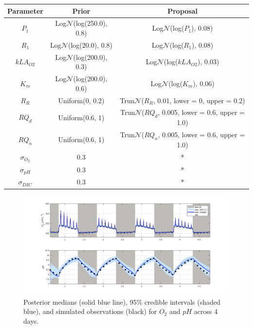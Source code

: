 \documentclass{ruthesis}
\begin{document}
\begin{tabular}{c | c  |  c}
	\hline
	\bfseries{Parameter} & \bfseries{Prior} &  \bfseries{Proposal} \\ \hline
	$P_1$  		& Log$\mathcal{N}$(log(250.0), 0.8)  & Log$\mathcal{N}$(log($P_1$), 0.08)   \\
	$R_1$  		& Log$\mathcal{N}$(log(20.0), 0.8)   & Log$\mathcal{N}$(log($R_1$), 0.08)   \\
	$kLA_{O2}$  & Log$\mathcal{N}$(log(200.0), 0.3)  & Log$\mathcal{N}$(log($kLA_{O2}$), 0.03) \\
	$K_m$ 		&  Log$\mathcal{N}$(log(200.0), 0.6) & Log$\mathcal{N}$(log($K_m$), 0.06) \\
	$R_R$  		& Uniform(0, 0.2) &  Trun$\mathcal{N}$($R_R$, 0.01, lower = 0, upper = 0.2) \\
	$RQ_d$  	& Uniform(0.6, 1) &  Trun$\mathcal{N}$($RQ_d$, 0.005, lower = 0.6, upper = 1.0)\\
	$RQ_n$  	& Uniform(0.6, 1) &  Trun$\mathcal{N}$($RQ_n$, 0.005, lower = 0.6, upper = 1.0)\\
	$\sigma_{O_2}$ 	& 0.3 	& * \\
	$\sigma_{pH}$ 	& 0.3 	& * \\
	$\sigma_{DIC}$ 	& 0.3 	& * \\	
\end{tabular}

 

\begin{figure}
	\centerline{\includegraphics[width=1.2\textwidth]{images_microalgae/posterior_plots_with_fake_data/O2_pH}}
	\caption[.]{Posterior medians (solid blue line), 95\% credible intervals (shaded blue), and simulated observations (black) for $O_2$ and $pH$ across 4 days.}
	\label{fig:pos_sim_O2_pH}
\end{figure}
\end{document}
